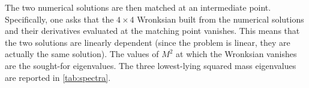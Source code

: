 The two numerical solutions are then matched at an intermediate point. Specifically, one asks that the $4\times 4$ Wronksian built from the numerical solutions and their derivatives evaluated at the matching point vanishes. This means that the two solutions are linearly dependent (since the problem is linear, they are actually the same solution). The values of $M^2$ at which the Wronksian vanishes are the sought-for eigenvalues. The three lowest-lying squared mass eigenvalues are reported in \eqref{tab:spectra}.

